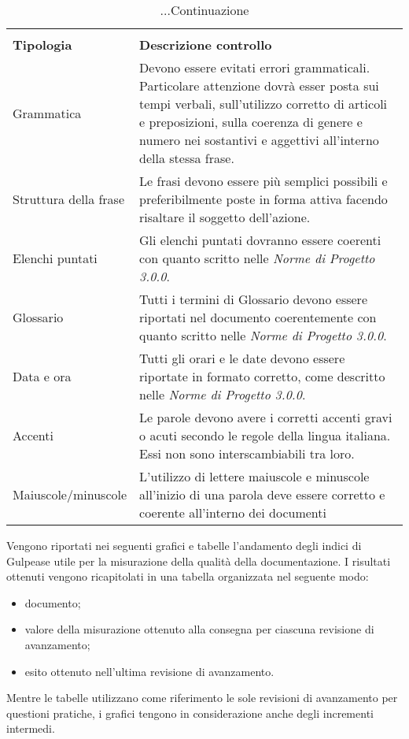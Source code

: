 \begin{longtable}{|C{4cm}|C{8.5cm}|}
	\caption{Tabella per la lista di controllo}\\
	\textbf{Tipologia} & \textbf{Descrizione controllo}\\
	\endfirsthead

	\caption[]{...Continuazione}

	\endhead

	Grammatica & Devono essere evitati errori grammaticali. Particolare attenzione dovrà esser posta sui tempi verbali, sull'utilizzo corretto di articoli e preposizioni, sulla coerenza di genere e numero nei sostantivi e aggettivi all'interno della stessa frase. \\

	Struttura della frase & Le frasi devono essere più semplici possibili e preferibilmente poste in forma attiva facendo risaltare il soggetto dell'azione. \\

	Elenchi puntati & Gli elenchi puntati dovranno essere coerenti con quanto scritto nelle \textit{Norme di Progetto 3.0.0\docs}. \\

	Glossario & Tutti i termini di Glossario devono essere riportati nel documento coerentemente con quanto scritto nelle \textit{Norme di Progetto 3.0.0\docs}. \\

	Data e ora & Tutti gli orari e le date devono essere riportate in formato corretto, come descritto nelle \textit{Norme di Progetto 3.0.0\docs}. \\

	Accenti & Le parole devono avere i corretti accenti gravi o acuti secondo le regole della lingua italiana. Essi non sono interscambiabili tra loro. \\

	Maiuscole/minuscole & L'utilizzo di lettere maiuscole e minuscole all'inizio di una parola deve essere corretto e coerente all'interno dei documenti\\
	\hline
\end{longtable}
\vspace{0.5cm}

\noindent Vengono riportati nei seguenti grafici e tabelle l'andamento degli indici di Gulpease utile per la misurazione della qualità della documentazione. I risultati ottenuti vengono ricapitolati in una tabella organizzata nel seguente modo:
\begin{itemize}
	\item documento;
	\item valore della misurazione ottenuto alla consegna per ciascuna revisione di avanzamento;
	\item esito ottenuto nell'ultima revisione di avanzamento.
\end{itemize}
Mentre le tabelle utilizzano come riferimento le sole revisioni di avanzamento per questioni pratiche, i grafici tengono in considerazione anche degli incrementi intermedi.

